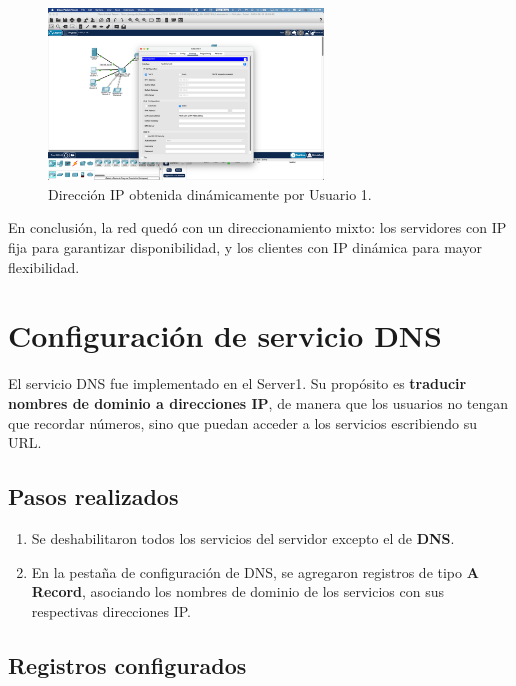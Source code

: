 \documentclass[10pt]{article}
\begin{document}
\begin{figure}[H]
    \centering
    \includegraphics[width=0.65\textwidth]{lab-01-screenshots/41-6-user1-ip.png}
    \caption{Dirección IP obtenida dinámicamente por Usuario 1.}
\end{figure}

\bigskip
En conclusión, la red quedó con un direccionamiento mixto: los servidores con IP fija para garantizar disponibilidad, y los clientes con IP dinámica para mayor flexibilidad.


\section{Configuración de servicio DNS}

El servicio DNS fue implementado en el Server1. Su propósito es \textbf{traducir nombres de dominio a direcciones IP}, de manera que los usuarios no tengan que recordar números, sino que puedan acceder a los servicios escribiendo su URL.

\subsection{Pasos realizados}

\begin{enumerate}
    \item Se deshabilitaron todos los servicios del servidor excepto el de \textbf{DNS}.
    \item En la pestaña de configuración de DNS, se agregaron registros de tipo \textbf{A Record}, asociando los nombres de dominio de los servicios con sus respectivas direcciones IP.
\end{enumerate}

\subsection{Registros configurados}
\end{document}
